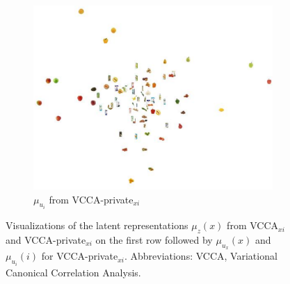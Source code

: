 \begin{figure}[p]
\begin{minipage}{0.8\textwidth}
\begin{subfigure}[t]{0.75\textwidth}
	    	\includegraphics[width=\textwidth]{PaperB/appendix/figures/vcca_private_xi/vcca_private_xi_ui_space.pdf}
	    	\caption{$\mu_{u_{i}}$ from VCCA-private$_{x i}$}
	    	\label{fig:pca_vcca_private_xi_ui}
	    \end{subfigure}
    \end{minipage}
    \caption{Visualizations of the latent representations $\mu_{z}(x)$ from VCCA$_{x i}$ and VCCA-private$_{x i}$ on the first row followed by $\mu_{u_{x}}(x)$ and $\mu_{u_{i}}(i)$ for VCCA-private$_{x i}$. Abbreviations: VCCA, Variational Canonical Correlation Analysis.}
    \label{fig:2d_visualizations_pca_vcca_private_xi}
\end{figure}

